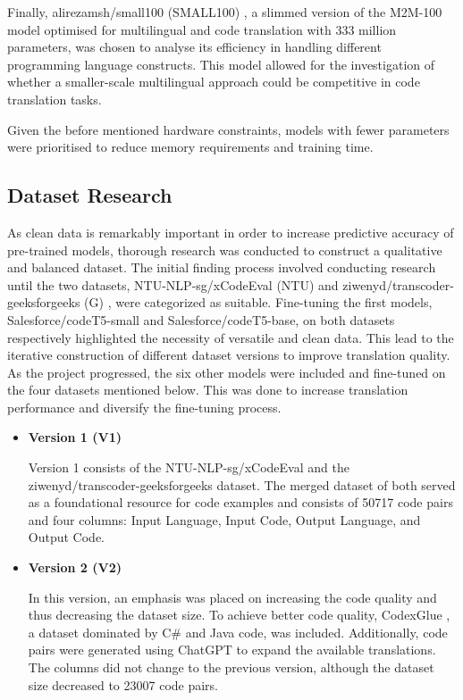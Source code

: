 \documentclass[conference]{IEEEtran}
\begin{document}
Finally, alirezamsh/small100 (SMALL100) \cite{b9}, a slimmed version of the M2M-100 model optimised for multilingual and code translation with 333 million parameters, was chosen to analyse its efficiency in handling different programming language constructs. This model allowed for the investigation of whether a smaller-scale multilingual approach could be competitive in code translation tasks.

Given the before mentioned hardware constraints, models with fewer parameters were prioritised to reduce memory requirements and training time. 

\subsection{Dataset Research}\label{data}
As clean data is remarkably important in order to increase predictive accuracy of pre-trained models, thorough research was conducted to construct a qualitative and balanced dataset. 
The initial finding process involved conducting research until the two datasets, NTU-NLP-sg/xCodeEval (NTU) \cite{b10} and ziwenyd/transcoder-geeksforgeeks (G) \cite{b11}, were categorized as suitable. Fine-tuning the first models, Salesforce/codeT5-small and Salesforce/codeT5-base, on both datasets respectively highlighted the necessity of versatile and clean data. This lead to the iterative construction of different dataset versions to improve translation quality. As the project progressed, the six other models were included and fine-tuned on the four datasets mentioned below. 
This was done to increase translation performance and diversify the fine-tuning process.

\begin{itemize}
    \item \textbf{Version 1 (V1)}
        
        Version 1 consists of the NTU-NLP-sg/xCodeEval and the ziwenyd/transcoder-geeksforgeeks dataset. The merged dataset of both served as a foundational resource for code examples and consists of 50717 code pairs and four columns: Input Language, Input Code, Output Language, and Output Code. 
    
    \item \textbf{Version 2 (V2)}
        
        In this version, an emphasis was placed on increasing the code quality and thus decreasing the dataset size. To achieve better code quality, CodexGlue \cite{b12}, a dataset  dominated by C\# and Java code, was included. Additionally, code pairs were generated using ChatGPT to expand the available translations. The columns did not change to the previous version, although the dataset size decreased to 23007 code pairs.
    
\end{itemize}
\end{document}
